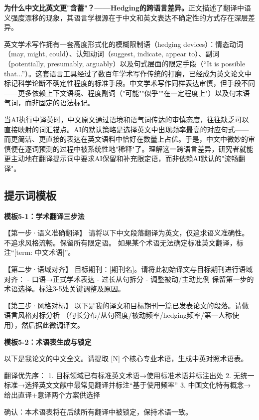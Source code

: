 \begin{funbox}
\textbf{为什么中文比英文更"含蓄"？——Hedging的跨语言差异。}正文描述了翻译中语义强度漂移的现象，其语言学根源在于中文和英文表达不确定性的方式存在深层差异。

英文学术写作拥有一套高度形式化的模糊限制语（hedging devices）：情态动词（may, might, could）、认知动词（suggest, indicate, appear to）、副词（potentially, presumably, arguably）以及句式层面的限定手段（``It is possible that...''）。这套语言工具经过了数百年学术写作传统的打磨，已经成为英文论文中标记科学论断不确定性程度的标准手段。中文学术写作同样表达审慎，但手段不同——更多依赖上下文语境、程度副词（"可能""似乎""在一定程度上"）以及句末语气词，而非固定的语法标记。

当AI执行中译英时，中文原文通过语境和语气词传达的审慎态度，往往缺乏可以直接映射的词汇锚点。AI的默认策略是选择英文中出现频率最高的对应句式——而更简洁、更直接的表达在英文语料中恰好在数量上占优。于是，中文中微妙的审慎便在逐词预测的过程中被系统性地"稀释"了。理解这一跨语言差异，研究者就能更主动地在翻译提示词中要求AI保留和补充限定语，而非依赖AI默认的"流畅翻译"。
\end{funbox}


\subsection*{提示词模板}

\textbf{模板5-1：学术翻译三步法}

\begin{tcolorbox}[promptbox]
【第一步·语义准确翻译】
请将以下中文段落翻译为英文，仅追求语义准确性。不追求风格流畅。保留所有限定语。
如果某个术语无法确定标准英文翻译，标注``[term: 中文术语]''。

【第二步·语域对齐】
目标期刊：[期刊名]。请将此初始译文与目标期刊进行语域对齐：
- 口语→正式学术表达
- 过长从句拆分
- 调整被动/主动比例
保留第一步的术语选择。标注3-5处关键调整及原因。

【第三步·风格对标】
以下是我的译文和目标期刊一篇已发表论文的段落。请做语言风格对标分析
（句长分布/从句密度/被动频率/hedging频率/第一人称使用），然后据此微调译文。
\end{tcolorbox}

\textbf{模板5-2：术语表生成与锁定}

\begin{tcolorbox}[promptbox]
以下是我论文的中文全文。请提取 [N] 个核心专业术语，生成中英对照术语表。

翻译优先序：
1. 目标领域已有标准英文术语→使用标准术语并标注出处
2. 无统一标准→选择英文文献中最常见翻译并标注``基于使用频率''
3. 中国文化特有概念→给出直译+意译两个方案供选择

确认：本术语表将在后续所有翻译中被锁定，保持术语一致。
\end{tcolorbox}

